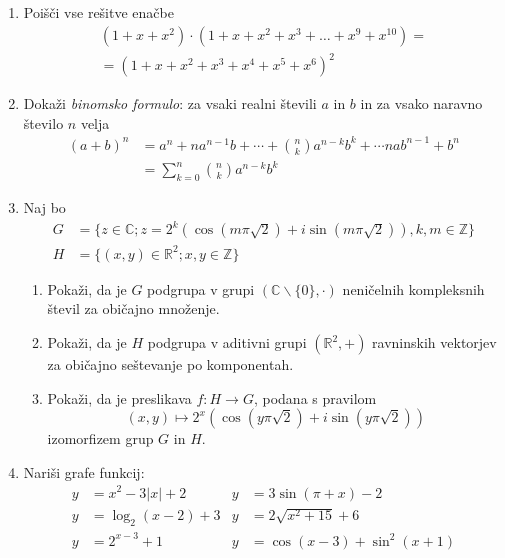 \documentclass[a4paper,12pt]{article}
\newcommand{\numC}{\mathbb{C}}
\newcommand{\numR}{\mathbb{R}}
\newcommand{\numZ}{\mathbb{Z}}
\begin{document}
\begin{enumerate}
\item
Poišči vse rešitve enačbe
\begin{multline*}
    (1 + x + x^2) \cdot (1 + x + x^2 + x^3 + \dots + x^9 + x^{10}) =\\
    = (1 + x + x^2 + x^3 + x^4 + x^5 + x^6)^2
\end{multline*}

\item
Dokaži \emph{binomsko formulo}: za vsaki realni števili $a$ in $b$
in za vsako naravno število $n$ velja
\begin{align*}
    (a + b)^n &= a^n + na^{n-1}b + \cdots + \binom{n}{k}a^{n-k} b^k + \cdots nab^{n-1} + b^n\\
              &= \sum_{k = 0}^{n} \binom{n}{k} a^{n-k} b^k
\end{align*}

\item
Naj bo
\begin{align*}
    G &= \{z \in \numC; z = 2^k (\cos(m \pi \sqrt{2}) + i\sin(m \pi \sqrt{2})),k,m \in \numZ\}\\
    H &= \{(x, y) \in \numR^2; x, y \in \numZ\}
\end{align*}
\begin{enumerate}
    \item Pokaži, da je $G$ podgrupa v grupi $(\numC \backslash \{0\}, \cdot)$
    neničelnih kompleksnih števil za običajno množenje.
    \item Pokaži, da je $H$ podgrupa v aditivni grupi $(\numR^2, +)$
    ravninskih vektorjev za običajno seštevanje po komponentah.
    \item Pokaži, da je preslikava $f: H \to G$, podana s pravilom
    \[
        (x, y) \mapsto 2^x  (\cos(y \pi \sqrt{2}) + i\sin(y \pi \sqrt{2}))
    \]
    izomorfizem grup $G$ in $H$.
\end{enumerate}

\item
Nariši grafe funkcij:
\begin{align*}
    y &= x^2 - 3|x| + 2    & y &= 3 \sin(\pi + x) - 2\\
    y &= \log_2(x - 2) + 3 & y &= 2 \sqrt{x^2 + 15} + 6\\
    y &= 2^{x - 3} + 1     & y &= \cos(x - 3) + \sin^2(x + 1) 
\end{align*}
\end{enumerate}
\end{document}
